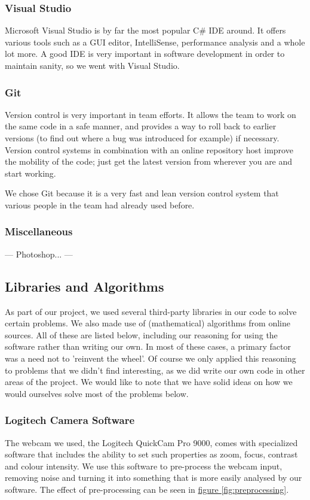 \documentclass[10pt, abstracton]{scrartcl}
\newcommand{\fref}[1]{\hyperref[#1]{figure \vref{#1}}}
\begin{document}
\subsubsection{Visual Studio}
Microsoft Visual Studio is by far the most popular C\# IDE around. It offers various tools such as a GUI editor, IntelliSense, performance analysis and a whole lot more. A good IDE is very important in software development in order to maintain sanity, so we went with Visual Studio.

\subsubsection{Git}
Version control is very important in team efforts. It allows the team to work on the same code in a safe manner, and provides a way to roll back to earlier versions (to find out where a bug was introduced for example) if necessary. Version control systems in combination with an online repository host improve the mobility of the code; just get the latest version from wherever you are and start working.

We chose Git because it is a very fast and lean version control system that various people in the team had already used before.

\subsubsection{Miscellaneous}
---
Photoshop...
---

\subsection{Libraries and Algorithms}
As part of our project, we used several third-party libraries in our code to solve certain problems. We also made use of (mathematical) algorithms from online sources. All of these are listed below, including our reasoning for using the software rather than writing our own. In most of these cases, a primary factor was a need not to 'reinvent the wheel'. Of course we only applied this reasoning to problems that we didn't find interesting, as we did write our own code in other areas of the project. We would like to note that we have solid ideas on how we would ourselves solve most of the problems below.

\subsubsection{Logitech Camera Software}
The webcam we used, the Logitech QuickCam Pro 9000, comes with specialized software that includes the ability to set such properties as zoom, focus, contrast and colour intensity. We use this software to pre-process the webcam input, removing noise and turning it into something that is more easily analysed by our software. The effect of pre-processing can be seen in \fref{fig:preprocessing}.
\end{document}
